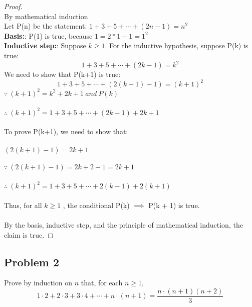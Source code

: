 \documentclass[paper=a4, fontsize=11pt]{scrartcl} %
\numberwithin{equation}{section} %
\numberwithin{figure}{section} %
\numberwithin{table}{section} %
\newcommand{\problem}[1]{\subsection *{Problem #1}}
\newcommand{\basis}{\textbf{Basis:}: }
\newcommand{\inductiveStep}{\textbf{Inductive step:}: }
\newcommand{\pnl}{$ $\newline\\}
\begin{document}
\begin{proof}
\pnl
By mathematical induction\\
Let P(n) be the statement: $1+3+5+\cdots+(2n-1) = n^2$\\
\basis P(1) is true, because $1 = 2*1 - 1 = 1^2$\\
\inductiveStep Suppose $k \geq 1$. For the inductive hypothesis, suppose P(k) is true: \\
$$1+3+5+\cdots+(2k-1) = k^2$$
We need to show that P(k+1) is true:
$$1+3+5+\cdots+(2(k+1)-1) = (k+1)^2$$
$\because \ (k+1)^2 = k^2 + 2k + 1 \ and \ P(k)$\\\\
$\therefore \ (k+1)^2 =1+3+5+\cdots+(2k-1)+2k+1$\\\\
To prove P(k+1), we need to show that:\\\\
$(2(k+1)-1) = 2k+1$\\\\
$\because \ (2(k+1)-1) = 2k + 2 - 1 = 2k + 1$\\\\
$\therefore \ (k+1)^2 =1+3+5+\cdots+2(k-1)+2(k+1)$\\\\
Thus, for all $k \geq 1$ , the conditional P(k) $\implies$ P(k + 1) is true.\\\\
By the basis, inductive step, and the principle of mathematical induction, the claim is true.
\end{proof}

\problem 2 Prove by induction on $n$ that, for each $n \geq 1,$
\[1\cdot2+2\cdot3+3\cdot4+\cdots+n\cdot(n+1)=\frac{n\cdot(n+1)(n+2)}{3}\]
\end{document}
